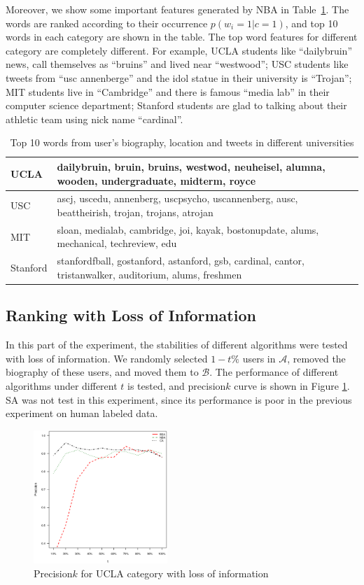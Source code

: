 \documentclass{article}
\begin{document}
Moreover, we show some important features generated by NBA in Table~\ref{tab:keyword}. The words are ranked according to their occurrence $p(w_i = 1 | c = 1)$, and top 10 words in each category are shown in the table. The top word features for different category are completely different. For example, UCLA students like ``dailybruin'' news, call themselves as ``bruins'' and lived near ``westwood''; USC students like tweets from ``usc annenberge'' and the idol statue in their university is ``Trojan''; MIT students live in ``Cambridge'' and there is famous ``media lab'' in their computer science department; Stanford students are glad to talking about their athletic team using nick name ``cardinal''.

\begin{table}[htbp]
\centering
\begin{tabular}{|l|l|}
\hline
UCLA & dailybruin, bruin, bruins, westwod, neuheisel, alumna, wooden, undergraduate, midterm, royce \\
\hline
USC & ascj, uscedu, annenberg, uscpsycho, uscannenberg, ausc, beattheirish, trojan, trojans, atrojan \\
\hline
MIT & sloan, medialab, cambridge, joi, kayak, bostonupdate, alums, mechanical, techreview, edu \\
\hline
Stanford & stanfordfball, gostanford, astanford, gsb, cardinal, cantor, tristanwalker, auditorium, alums, freshmen \\
\hline
\end{tabular}
\caption{Top 10 words from user's biography, location and tweets in different universities}\label{tab:keyword}
\end{table}

\subsection{Ranking with Loss of Information}
In this part of the experiment, the stabilities of different algorithms were tested with loss of information. We randomly selected $1-t\%$ users in $\mathcal{A}$, removed the biography of these users, and moved them to $\mathcal{B}$. The performance of different algorithms under different $t$ is tested, and precision\at$k$ curve is shown in Figure \ref{fig:e3}. SA was not test in this experiment, since its performance is poor in the previous experiment on human labeled data.

\begin{figure}[htbp]
\centering
\includegraphics[width=0.45\textwidth]{experiment/e2.ucla.eps}
\caption{Precision\at$k$ for UCLA category with loss of information}
\label{fig:e3}
\end{figure}
\end{document}
